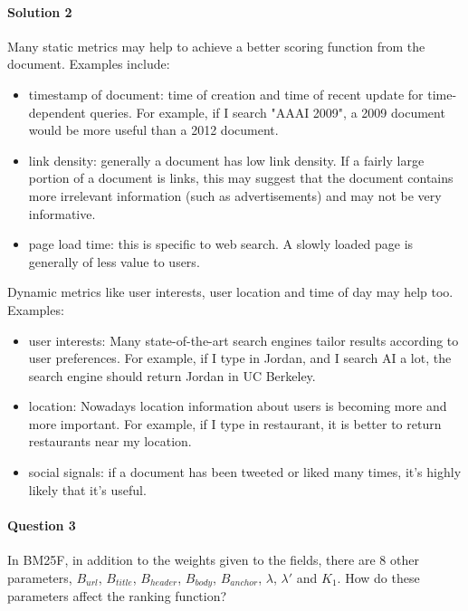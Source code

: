 \documentclass{article}
\begin{document}
\vspace{-3mm}
\paragraph{Solution 2}
Many static metrics may help to achieve a better scoring function from the document. Examples include:

\begin{itemize}
    \item timestamp of document: time of creation and time of recent update for time-dependent queries. For example, if I search "AAAI 2009", a 2009 document would be more useful than a 2012 document.
    \item link density: generally a document has low link density. If a fairly large portion of a document is links, this may suggest that the document contains more irrelevant information (such as advertisements) and may not be very informative.
    \item page load time: this is specific to web search. A slowly loaded page is generally of less value to users.
\end{itemize}

Dynamic metrics like user interests, user location and time of day may help too. Examples:

\begin{itemize}
    \item user interests: Many state-of-the-art search engines tailor results according to user preferences. For example, if I type in Jordan, and I search AI a lot, the search engine should return Jordan in UC Berkeley.
    \item location: Nowadays location information about users is becoming more and more important. For example, if I type in restaurant, it is better to return restaurants near my location.
    \item social signals: if a document has been tweeted or liked many times, it's highly likely that it's useful.
\end{itemize}

\paragraph{Question 3}
In BM25F, in addition to the weights given to the fields, there are 8 other parameters, $B_{url}$, $B_{title}$, $B_{header}$, $B_{body}$, $B_{anchor}$, $\lambda$, $\lambda'$ and $K_1$. How do these parameters affect the ranking function?
\end{document}
